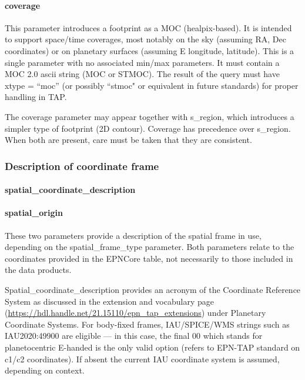 \documentclass[11pt,a4paper]{ivoa}
\begin{document}
\paragraph{coverage}

This parameter introduces a footprint as a MOC (healpix-based).
It is intended to support space/time coverages, most notably on the sky
(assuming RA, Dec coordinates) or on planetary surfaces (assuming
E longitude, latitude). This is a single parameter with no associated min/max
parameters. It must contain a MOC 2.0 ascii string (MOC or STMOC).
The result of the query must have xtype = ``moc'' (or possibly ``stmoc" or equivalent in future standards)
for proper handling in TAP.

The coverage parameter may appear together with s\_region, which introduces
a simpler type of footprint (2D contour). Coverage has precedence over
s\_region. When both are present, care must be taken that they are
consistent.

\subsubsection{Description of coordinate frame}

\paragraph{spatial\_coordinate\_description}

\paragraph{spatial\_origin}
\vspace{-15pt}
These two parameters provide a description of the spatial frame in use,
depending on the spatial\_frame\_type parameter. Both parameters relate
to the coordinates provided in the EPNCore table, not necessarily to
those included in the data products.

Spatial\_coordinate\_description provides an acronym of the
Coordinate Reference System as discussed in the extension and vocabulary
page (\url{https://hdl.handle.net/21.15110/epn_tap_extensions}) under Planetary Coordinate Systems.
For body-fixed frames, IAU/SPICE/WMS strings such as IAU2020:49900 are
eligible --- in this case, the final 00 which stands for planetocentric
E-handed is the only valid option (refers to EPN-TAP standard on c1/c2
coordinates). If absent the current IAU coordinate system is assumed,
depending on context.
\end{document}
